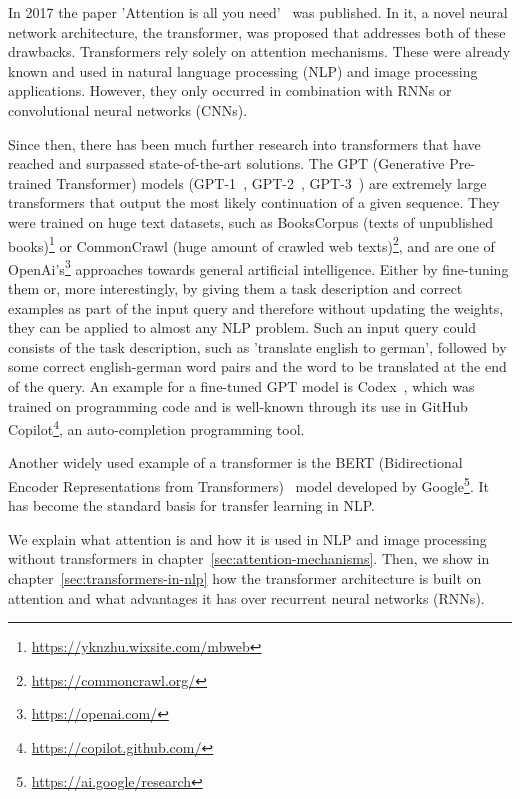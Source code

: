 \documentclass[a4paper]{scrartcl}
\begin{document}
    In 2017 the paper 'Attention is all you need'~\cite{vaswani2017attention} was published.
    In it, a novel neural network architecture, the transformer, was proposed that addresses both of these drawbacks.
    Transformers rely solely on attention mechanisms.
    These were already known and used in natural language processing (NLP) and image processing applications.
    However, they only occurred in combination with RNNs or convolutional neural networks (CNNs).

    Since then, there has been much further research into transformers that have reached and surpassed state-of-the-art solutions.
    The GPT (Generative Pre-trained Transformer) models (GPT-1~\cite{Radford2018ImprovingLU}, GPT-2~\cite{radford2019language}, GPT-3~\cite{brown2020language}) are extremely large transformers that output the most likely continuation of a given sequence.
    They were trained on huge text datasets, such as BooksCorpus (texts of unpublished books)\footnote{\href{https://yknzhu.wixsite.com/mbweb}{https://yknzhu.wixsite.com/mbweb}} or CommonCrawl (huge amount of crawled web texts)\footnote{\href{https://commoncrawl.org/}{https://commoncrawl.org/}}, and are one of OpenAi's\footnote{\href{https://openai.com/}{https://openai.com/}} approaches towards general artificial intelligence.
    Either by fine-tuning them or, more interestingly, by giving them a task description and correct examples as part of the input query and therefore without updating the weights, they can be applied to almost any NLP problem.
    Such an input query could consists of the task description, such as 'translate english to german', followed by some correct english-german word pairs and the word to be translated at the end of the query.
    An example for a fine-tuned GPT model is Codex~\cite{chen2021evaluating}, which was trained on programming code and is well-known through its use in GitHub Copilot\footnote{\href{https://copilot.github.com/}{https://copilot.github.com/}}, an auto-completion programming tool.

    Another widely used example of a transformer is the BERT (Bidirectional Encoder Representations from Transformers)~\cite{devlin2019bert} model developed by Google\footnote{\href{https://ai.google/research}{https://ai.google/research}}.
    It has become the standard basis for transfer learning in NLP\@.

    We explain what attention is and how it is used in NLP and image processing without transformers in chapter~\ref{sec:attention-mechanisms}.
    Then, we show in chapter~\ref{sec:transformers-in-nlp} how the transformer architecture is built on attention and what advantages it has over recurrent neural networks (RNNs).
\end{document}
